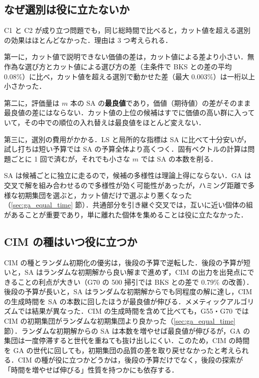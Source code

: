 \subsection{なぜ選別は役に立たないか}

C1 と C2 が成り立つ問題でも，同じ総時間で比べると，カット値を超える選別の効果はほとんどなかった．理由は 3 つ考えられる．

第一に，カット値で説明できない価値の差は，カット値による差より小さい．無作為な選び方とカット値による選び方の差（主条件で BKS との差の平均 0.08\%）に比べ，カット値を超える選別で動かせた差（最大 0.003\%）は一桁以上小さかった．

第二に，評価量は $m$ 本の SA の\textbf{最良値}であり，価値（期待値）の差がそのまま最良値の差にはならない．カット値の上位の候補はすでに価値の高い群に入っていて，その中での順位の入れ替えは最良値をほとんど変えない．

第三に，選別の費用がかかる．LS と局所的な指標は SA に比べて十分安いが，試し打ちは短い予算では SA の予算全体より高くつく．固有ベクトルの計算は問題ごとに 1 回で済むが，それでも小さな $m$ では SA の本数を削る．

SA は候補ごとに独立に走るので，候補の多様性は理論上得にならない．GA は交叉で解を組み合わせるので多様性が効く可能性があったが，ハミング距離で多様な初期集団を選ぶと，カット値だけで選ぶより悪くなった（\ref{sec:ga_equal_time} 節）．共通部分を引き継ぐ交叉では，互いに近い個体の組があることが重要であり，単に離れた個体を集めることは役に立たなかった．

\subsection{CIM の種はいつ役に立つか}

CIM の種とランダム初期化の優劣は，後段の予算で逆転した．後段の予算が短いと，SA はランダムな初期解から良い解まで進めず，CIM の出力を出発点にできることの利点が大きい（G70 の 500 掃引では BKS との差で 0.79\% の改善）．後段の予算が長いと，SA はランダムな初期解からでも同程度の解に達し，CIM の生成時間を SA の本数に回したほうが最良値が伸びる．メメティックアルゴリズムでは結果が異なった．CIM の生成時間を含めて比べても，G55・G70 では CIM の初期集団がランダムな初期集団より良かった（\ref{sec:ga_equal_time} 節）．ランダムな初期解からの SA は本数を増やせば最良値が伸びるが，GA の集団は一度停滞すると世代を重ねても抜け出しにくい．このため，CIM の時間を GA の世代に回しても，初期集団の品質の差を取り戻せなかったと考えられる．CIM の種が役に立つかどうかは，後段の予算だけでなく，後段の探索が「時間を増やせば伸びる」性質を持つかにも依存する．

